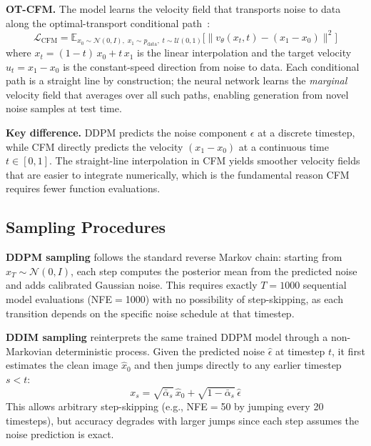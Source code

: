\documentclass[10pt]{article}
\begin{document}
  \textbf{OT-CFM.} The model learns the velocity field that transports noise to data along the optimal-transport conditional path~\cite{lipman2023flow}:
  \begin{equation}
      \mathcal{L}_{\text{CFM}} = \mathbb{E}_{x_0 \sim \mathcal{N}(0,I),\; x_1 \sim p_{\text{data}},\; t \sim \mathcal{U}(0,1)} \bigl[\| v_\theta(x_t, t) - (x_1 - x_0) \|^2\bigr]
  \end{equation}
  where $x_t = (1-t)\,x_0 + t\,x_1$ is the linear interpolation and the target velocity $u_t = x_1 - x_0$ is the constant-speed direction from noise to data. Each conditional path is a straight line
   by construction; the neural network learns the \emph{marginal} velocity field that averages over all such paths, enabling generation from novel noise samples at test time.

  \textbf{Key difference.} DDPM predicts the noise component $\epsilon$ at a discrete timestep, while CFM directly predicts the velocity $(x_1 - x_0)$ at a continuous time $t \in [0,1]$. The
  straight-line interpolation in CFM yields smoother velocity fields that are easier to integrate numerically, which is the fundamental reason CFM requires fewer function evaluations.

  \subsection{Sampling Procedures}

  \textbf{DDPM sampling} follows the standard reverse Markov chain: starting from $x_T \sim \mathcal{N}(0, I)$, each step computes the posterior mean from the predicted noise and adds calibrated
  Gaussian noise. This requires exactly $T{=}1000$ sequential model evaluations (NFE$=$1000) with no possibility of step-skipping, as each transition depends on the specific noise schedule at that
  timestep.

  \textbf{DDIM sampling} reinterprets the same trained DDPM model through a non-Markovian deterministic process. Given the predicted noise $\hat\epsilon$ at timestep $t$, it
   first estimates the clean image $\hat{x}_0$ and then jumps directly to any earlier timestep $s < t$:
  \begin{equation}
      x_s = \sqrt{\bar\alpha_s}\,\hat{x}_0 + \sqrt{1 - \bar\alpha_s}\,\hat\epsilon
  \end{equation}
  This allows arbitrary step-skipping (e.g., NFE$=$50 by jumping every 20 timesteps), but accuracy degrades with larger jumps since each step assumes the noise prediction is exact.
\end{document}

